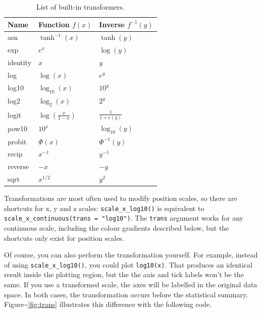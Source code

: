 \begin{table}
  \centering
  \begin{tabular}{lll}
    \toprule
    Name & Function $f(x)$ & Inverse $f^{-1}(y)$ \\
    \midrule
    asn       & $\tanh^{-1}(x)$ & $\tanh(y)$ \\
    exp       & $e ^ x$         & $\log(y)$  \\
    identity  & $x$             & $y$        \\
    log       & $\log(x)$       & $e ^ y$    \\
    log10     & $\log_{10}(x)$  & $10 ^ y$   \\
    log2      & $\log_2(x)$     & $2 ^ y$    \\
    logit     & $\log(\frac{x}{1 - x})$ & $\frac{1}{1 + e(y)} $ \\
    pow10     & $10^x$          & $\log_{10}(y) $ \\
    probit    & $\Phi(x)$       & $\Phi^{-1}(y)$ \\
    recip     & $x^{-1}$        & $y^{-1}$ \\
    reverse   & $-x$            & $-y$     \\
    sqrt      & $x^{1/2}$       & $y ^ 2$  \\
    \bottomrule
  \end{tabular}
  \caption{List of built-in transformers.}
  \label{tbl:common-trans}
\end{table}

Transformations are most often used to modify position scales, so there
are shortcuts for x, y and z scales: \texttt{scale\_x\_log10()} is
equivalent to \texttt{scale\_x\_continuous(trans = "log10")}. The
\texttt{trans} argument works for any continuous scale, including the
colour gradients described below, but the shortcuts only exist for
position scales.  

Of course, you can also perform the transformation yourself. For
example, instead of using \texttt{scale\_x\_log10()}, you could plot
\texttt{log10(x)}. That produces an identical result inside the plotting
region, but the the axis and tick labels won't be the same. If you use a
transformed scale, the axes will be labelled in the original data space.
In both cases, the transformation occurs before the statistical summary.
Figure\textasciitilde{}\ref{fig:trans} illustrates this difference with
the following code. 

